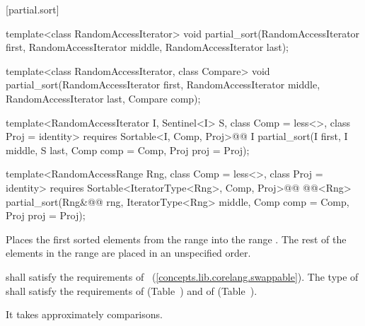 [partial.sort]{}

%
\begin{removedblock}
\begin{itemdecl}
template<class RandomAccessIterator>
  void partial_sort(RandomAccessIterator first,
                    RandomAccessIterator middle,
                    RandomAccessIterator last);

template<class RandomAccessIterator, class Compare>
  void partial_sort(RandomAccessIterator first,
                    RandomAccessIterator middle,
                    RandomAccessIterator last,
                    Compare comp);
\end{itemdecl}
\end{removedblock}
\begin{addedblock}
\begin{itemdecl}
template<RandomAccessIterator I, Sentinel<I> S, class Comp = less<>,
    class Proj = identity>
  requires Sortable<I, Comp, Proj>@\newtxt{()}@
  I partial_sort(I first, I middle, S last, Comp comp = Comp{}, Proj proj = Proj{});

template<RandomAccessRange Rng, class Comp = less<>, class Proj = identity>
  requires Sortable<IteratorType<Rng>, Comp, Proj>@\newtxt{()}@
  @@<Rng>
    partial_sort(Rng&@\newtxt{\&}@ rng, IteratorType<Rng> middle, Comp comp = Comp{},
                 Proj proj = Proj{});
\end{itemdecl}
\end{addedblock}

\begin{itemdescr}
\pnum
\effects
Places the first
sorted elements from the range
into the range
.
The rest of the elements in the range
are placed in an unspecified order.
%

\begin{removedblock}
\pnum
\requires
{} shall satisfy the requirements of
~(\ref{concepts.lib.corelang.swappable}). The type
of  shall satisfy the requirements of
 (Table~) and of
 (Table~).
\end{removedblock}

\pnum
\complexity
It takes approximately
comparisons.
\end{itemdescr}

